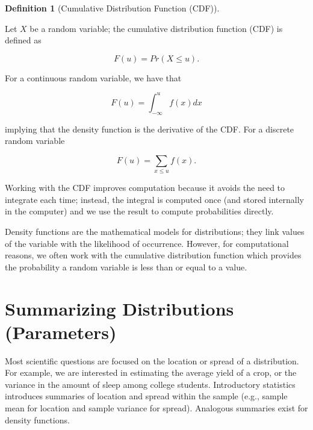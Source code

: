 \documentclass[
  letterpaper,
  DIV=11,
  numbers=noendperiod]{scrreprt}
\theoremstyle{definition}
\theoremstyle{definition}
\newtheorem{definition}{Definition}[chapter]
\theoremstyle{remark}
\begin{document}
\begin{definition}[Cumulative Distribution Function
(CDF)]\protect\hypertarget{def-cdf}{}\label{def-cdf}

Let \(X\) be a random variable; the cumulative distribution function
(CDF) is defined as

\[F(u) = Pr(X \leq u).\]

For a continuous random variable, we have that

\[F(u) = \int_{-\infty}^{u} f(x) dx\]

implying that the density function is the derivative of the CDF. For a
discrete random variable

\[F(u) = \sum_{x \leq u} f(x).\]

\end{definition}

Working with the CDF improves computation because it avoids the need to
integrate each time; instead, the integral is computed once (and stored
internally in the computer) and we use the result to compute
probabilities directly.

\begin{tcolorbox}[enhanced jigsaw, bottomrule=.15mm, titlerule=0mm, bottomtitle=1mm, colback=white, coltitle=black, rightrule=.15mm, leftrule=.75mm, toprule=.15mm, toptitle=1mm, left=2mm, opacityback=0, colframe=quarto-callout-tip-color-frame, breakable, title=\textcolor{quarto-callout-tip-color}{\faLightbulb}\hspace{0.5em}{Big Idea}, arc=.35mm, colbacktitle=quarto-callout-tip-color!10!white, opacitybacktitle=0.6]

Density functions are the mathematical models for distributions; they
link values of the variable with the likelihood of occurrence. However,
for computational reasons, we often work with the cumulative
distribution function which provides the probability a random variable
is less than or equal to a value.

\end{tcolorbox}

\hypertarget{summarizing-distributions-parameters}{%
\section{Summarizing Distributions
(Parameters)}\label{summarizing-distributions-parameters}}

Most scientific questions are focused on the location or spread of a
distribution. For example, we are interested in estimating the average
yield of a crop, or the variance in the amount of sleep among college
students. Introductory statistics introduces summaries of location and
spread within the sample (e.g., sample mean for location and sample
variance for spread). Analogous summaries exist for density functions.
\end{document}
